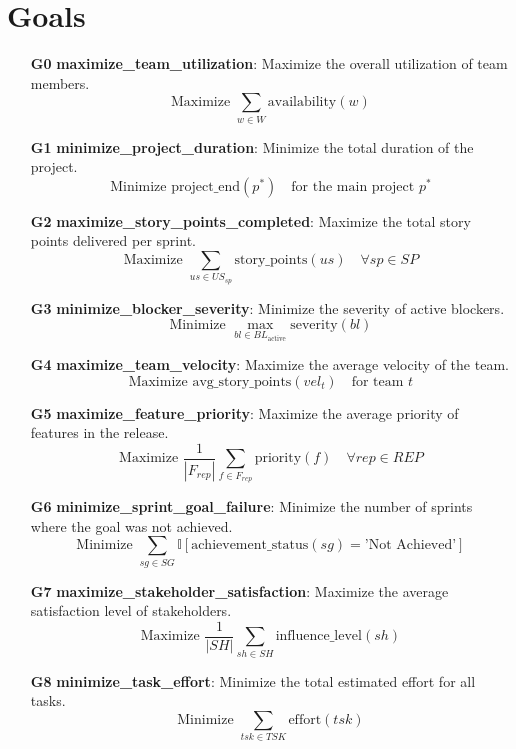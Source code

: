 \documentclass[11pt]{article}
\begin{document}
\section{Goals}
\begin{itemize}
    \item[\textbf{G0}] \textbf{maximize\_team\_utilization}: Maximize the overall utilization of team members.
    \[ \text{Maximize } \sum_{w \in W} \text{availability}(w) \]

    \item[\textbf{G1}] \textbf{minimize\_project\_duration}: Minimize the total duration of the project.
    \[ \text{Minimize } \text{project\_end}(p^*) \quad \text{for the main project } p^* \]

    \item[\textbf{G2}] \textbf{maximize\_story\_points\_completed}: Maximize the total story points delivered per sprint.
    \[ \text{Maximize } \sum_{us \in US_{sp}} \text{story\_points}(us) \quad \forall sp \in SP \]

    \item[\textbf{G3}] \textbf{minimize\_blocker\_severity}: Minimize the severity of active blockers.
    \[ \text{Minimize } \max_{bl \in BL_{\text{active}}} \text{severity}(bl) \]

    \item[\textbf{G4}] \textbf{maximize\_team\_velocity}: Maximize the average velocity of the team.
    \[ \text{Maximize } \text{avg\_story\_points}(vel_t) \quad \text{for team } t \]

    \item[\textbf{G5}] \textbf{maximize\_feature\_priority}: Maximize the average priority of features in the release.
    \[ \text{Maximize } \frac{1}{|F_{rep}|} \sum_{f \in F_{rep}} \text{priority}(f) \quad \forall rep \in REP \]

    \item[\textbf{G6}] \textbf{minimize\_sprint\_goal\_failure}: Minimize the number of sprints where the goal was not achieved.
    \[ \text{Minimize } \sum_{sg \in SG} \mathbb{I}[\text{achievement\_status}(sg) = \text{'Not Achieved'}] \]

    \item[\textbf{G7}] \textbf{maximize\_stakeholder\_satisfaction}: Maximize the average satisfaction level of stakeholders.
    \[ \text{Maximize } \frac{1}{|SH|} \sum_{sh \in SH} \text{influence\_level}(sh) \]

    \item[\textbf{G8}] \textbf{minimize\_task\_effort}: Minimize the total estimated effort for all tasks.
    \[ \text{Minimize } \sum_{tsk \in TSK} \text{effort}(tsk) \]


\end{itemize}
\end{document}
